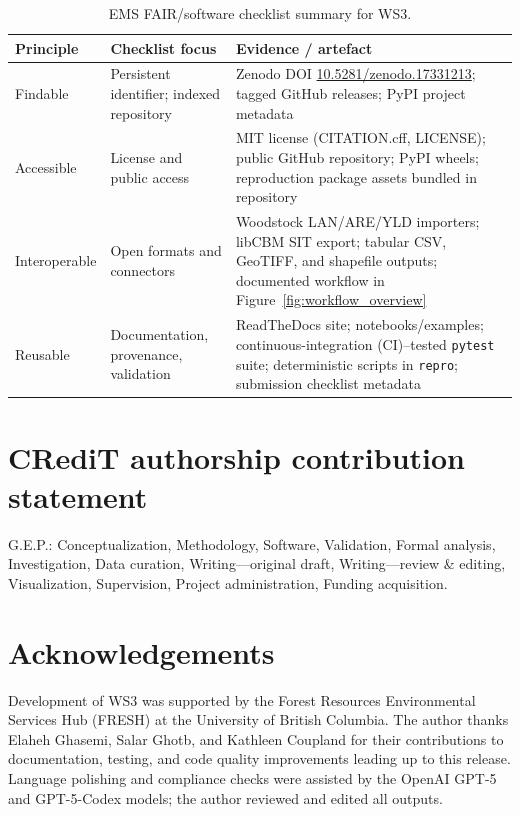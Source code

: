 \documentclass[review]{elsarticle}
\begin{document}
\begin{table}[h]
  \centering
  \caption{EMS FAIR/software checklist summary for WS3.}
  \label{tab:fair-checklist}
  \footnotesize
  \begin{tabular}{p{2.1cm}p{3.4cm}p{6.1cm}}
    \toprule
    Principle & Checklist focus & Evidence / artefact \\
    \midrule
    Findable & Persistent identifier; indexed repository & Zenodo DOI \href{https://doi.org/10.5281/zenodo.17331213}{10.5281/zenodo.17331213}; tagged GitHub releases; PyPI project metadata \\
    Accessible & License and public access & MIT license (CITATION.cff, LICENSE); public GitHub repository; PyPI wheels; reproduction package assets bundled in repository \\
    Interoperable & Open formats and connectors & Woodstock LAN/ARE/YLD importers; libCBM SIT export; tabular CSV, GeoTIFF, and shapefile outputs; documented workflow in Figure~\ref{fig:workflow_overview} \\
    Reusable & Documentation, provenance, validation & ReadTheDocs site; notebooks/examples; continuous-integration (CI)–tested \texttt{pytest} suite; deterministic scripts in \texttt{repro}; submission checklist metadata \\
    \bottomrule
  \end{tabular}
\end{table}

\section*{CRediT authorship contribution statement}
G.E.P.: Conceptualization, Methodology, Software, Validation, Formal analysis, Investigation, Data curation, Writing—original draft, Writing—review \& editing, Visualization, Supervision, Project administration, Funding acquisition.

\section*{Acknowledgements}
Development of WS3 was supported by the Forest Resources Environmental Services Hub (FRESH) at the University of British Columbia. The author thanks Elaheh Ghasemi, Salar Ghotb, and Kathleen Coupland for their contributions to documentation, testing, and code quality improvements leading up to this release. Language polishing and compliance checks were assisted by the OpenAI GPT-5 and GPT-5-Codex models; the author reviewed and edited all outputs.
\end{document}
